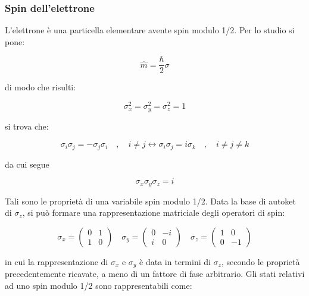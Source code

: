 \documentclass{article}
\begin{document}
\subsubsection{Spin dell'elettrone}
L'elettrone è una particella elementare avente spin modulo 1/2.
Per lo studio si pone:

\begin{equation}
    \hat{m}=\frac{\hbar}{2}\sigma
\end{equation}

di modo che risulti:

\begin{equation}
    \sigma_x^2=\sigma_y^2=\sigma_z^2=1
\end{equation}

si trova che:

\begin{equation}
    \sigma_i \sigma_j= -\sigma_j \sigma_i \quad , \quad i \neq j \leftrightarrow \sigma_i \sigma_j= i\sigma_k \quad , \quad i \neq j \neq k
\end{equation}

da cui segue

\begin{equation}
    \sigma_x \sigma_y \sigma_z = i
\end{equation}

Tali sono le proprietà di una variabile spin modulo 1/2.
Data la base di autoket di $\sigma_z$, si può formare una rappresentazione matriciale
degli operatori di spin:

\begin{equation}
    \sigma_x=\begin{pmatrix}
        0 & 1 \\
        1 & 0
    \end{pmatrix}
    \quad
    \sigma_y=\begin{pmatrix}
        0 & -i \\
        i & 0
    \end{pmatrix}
    \quad
    \sigma_z=\begin{pmatrix}
        1 & 0  \\
        0 & -1
    \end{pmatrix}
\end{equation}

in cui la rappresentazione di $\sigma_x$ e $\sigma_y$ è data in termini di $\sigma_z$, secondo le proprietà precedentemente ricavate, a meno di
un fattore di fase arbitrario.
Gli stati relativi ad uno spin modulo 1/2 sono rappresentabili come:
\end{document}
